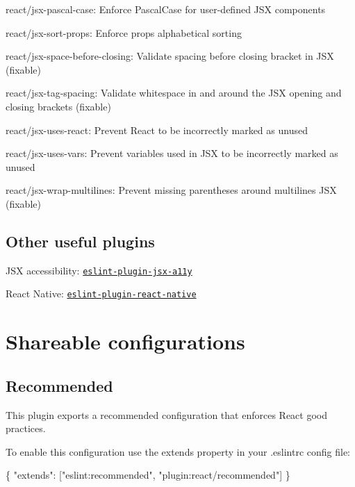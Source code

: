 \begin{DoxyItemize}
\item react/jsx-\/pascal-\/case\+: Enforce Pascal\+Case for user-\/defined J\+SX components
\item react/jsx-\/sort-\/props\+: Enforce props alphabetical sorting
\item react/jsx-\/space-\/before-\/closing\+: Validate spacing before closing bracket in J\+SX (fixable)
\item react/jsx-\/tag-\/spacing\+: Validate whitespace in and around the J\+SX opening and closing brackets (fixable)
\item react/jsx-\/uses-\/react\+: Prevent React to be incorrectly marked as unused
\item react/jsx-\/uses-\/vars\+: Prevent variables used in J\+SX to be incorrectly marked as unused
\item react/jsx-\/wrap-\/multilines\+: Prevent missing parentheses around multilines J\+SX (fixable)
\end{DoxyItemize}

\subsection*{Other useful plugins}


\begin{DoxyItemize}
\item J\+SX accessibility\+: \href{https://github.com/evcohen/eslint-plugin-jsx-a11y}{\tt eslint-\/plugin-\/jsx-\/a11y}
\item React Native\+: \href{https://github.com/Intellicode/eslint-plugin-react-native}{\tt eslint-\/plugin-\/react-\/native}
\end{DoxyItemize}

\section*{Shareable configurations}

\subsection*{Recommended}

This plugin exports a {\ttfamily recommended} configuration that enforces React good practices.

To enable this configuration use the {\ttfamily extends} property in your {\ttfamily .eslintrc} config file\+:


\begin{DoxyCode}
\{
  "extends": ["eslint:recommended", "plugin:react/recommended"]
\}
\end{DoxyCode}


